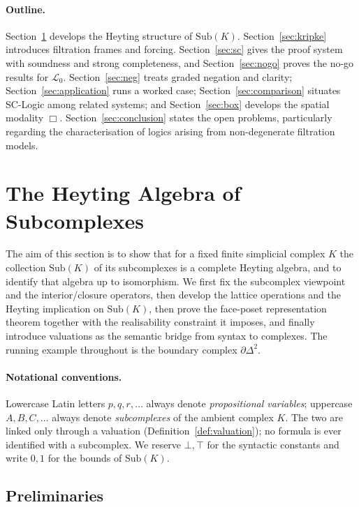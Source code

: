 \documentclass[final,12pt]{elsarticle}
\theoremstyle{plain}
\theoremstyle{definition}
\begin{document}
\paragraph{Outline.}
Section~\ref{sec:heyting} develops the Heyting structure of $\mathrm{Sub}(K)$.
Section~\ref{sec:kripke} introduces filtration frames and forcing.
Section~\ref{sec:sc} gives the proof system with soundness and strong
completeness, and Section~\ref{sec:nogo} proves the no-go results for
$\mathcal{L}_0$. Section~\ref{sec:neg} treats graded negation and clarity;
Section~\ref{sec:application} runs a worked case;
Section~\ref{sec:comparison} situates SC-Logic among related systems; and
Section~\ref{sec:box} develops the spatial modality $\Box$.
Section~\ref{sec:conclusion} states the open problems, particularly regarding
the characterisation of logics arising from non-degenerate filtration models.



\section{The Heyting Algebra of Subcomplexes}
\label{sec:heyting}

The aim of this section is to show that for a fixed finite simplicial complex
\(K\) the collection \(\mathrm{Sub}(K)\) of its subcomplexes is a complete
Heyting algebra, and to identify that algebra up to isomorphism. We first fix
the subcomplex viewpoint and the interior/closure operators, then develop the
lattice operations and the Heyting implication on \(\mathrm{Sub}(K)\), then prove
the face-poset representation theorem together with the realisability constraint
it imposes, and finally introduce valuations as the semantic bridge from syntax
to complexes. The running example throughout is the boundary complex
\(\partial\Delta^2\).

\paragraph{Notational conventions.}
Lowercase Latin letters \(p,q,r,\dots\) always denote \emph{propositional
variables}; uppercase \(A,B,C,\dots\) always denote \emph{subcomplexes} of the
ambient complex \(K\). The two are linked only through a valuation
(Definition~\ref{def:valuation}); no formula is ever identified with a
subcomplex. We reserve \(\bot,\top\) for the syntactic constants and write
\(0,1\) for the bounds of \(\mathrm{Sub}(K)\).

\subsection{Preliminaries}
\label{subsec:preliminaries}
\end{document}
